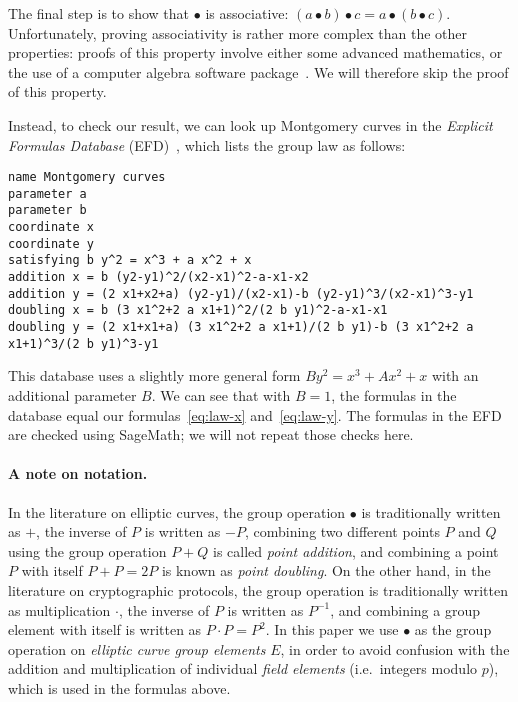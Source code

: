 \documentclass[manuscript]{acmart}
\begin{document}
The final step is to show that $\bullet$ is associative: $(a \bullet b) \bullet c = a \bullet (b \bullet c)$.
Unfortunately, proving associativity is rather more complex than the other properties: proofs of this property involve either some advanced mathematics, or the use of a computer algebra software package~\cite{Friedl:2017js,Fujii:2017eb}.
We will therefore skip the proof of this property.

Instead, to check our result, we can look up Montgomery curves in the \emph{Explicit Formulas Database} (EFD)~\cite{MontgomeryEFD}, which lists the group law as follows:
\begin{verbatim}
name Montgomery curves
parameter a
parameter b
coordinate x
coordinate y
satisfying b y^2 = x^3 + a x^2 + x
addition x = b (y2-y1)^2/(x2-x1)^2-a-x1-x2
addition y = (2 x1+x2+a) (y2-y1)/(x2-x1)-b (y2-y1)^3/(x2-x1)^3-y1
doubling x = b (3 x1^2+2 a x1+1)^2/(2 b y1)^2-a-x1-x1
doubling y = (2 x1+x1+a) (3 x1^2+2 a x1+1)/(2 b y1)-b (3 x1^2+2 a x1+1)^3/(2 b y1)^3-y1
\end{verbatim}
This database uses a slightly more general form $B y^2 = x^3 + A x^2 + x$ with an additional parameter $B$.
We can see that with $B=1$, the formulas in the database equal our formulas~\eqref{eq:law-x} and~\eqref{eq:law-y}.
The formulas in the EFD are checked using SageMath; we will not repeat those checks here.

\paragraph{A note on notation.}
In the literature on elliptic curves, the group operation $\bullet$ is traditionally written as $+$, the inverse of $P$ is written as $-P$, combining two different points $P$ and $Q$ using the group operation $P+Q$ is called \emph{point addition}, and combining a point $P$ with itself $P+P=2P$ is known as \emph{point doubling}.
On the other hand, in the literature on cryptographic protocols, the group operation is traditionally written as multiplication $\cdot$, the inverse of $P$ is written as $P^{-1}$, and combining a group element with itself is written as $P \cdot P = P^2$.
In this paper we use $\bullet$ as the group operation on \emph{elliptic curve group elements} $E$, in order to avoid confusion with the addition and multiplication of individual \emph{field elements} (i.e.\ integers modulo $p$), which is used in the formulas above.
\end{document}
